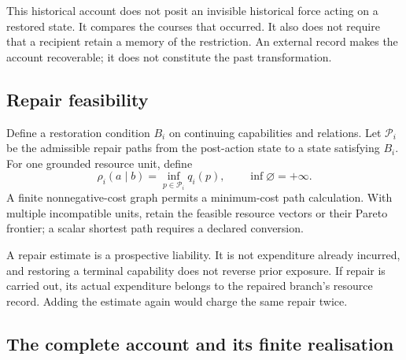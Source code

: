 \documentclass[11pt,a4paper]{article}
\theoremstyle{remark}
\begin{document}
This historical account does not posit an invisible historical force acting
on a restored state. It compares the courses that occurred. It also does not
require that a recipient retain a memory of the restriction. An external record
makes the account recoverable; it does not constitute the past transformation.

\subsection{Repair feasibility}

Define a restoration condition $B_i$ on continuing capabilities and relations.
Let $\mathcal P_i$ be the admissible repair paths from the post-action state to a
state satisfying $B_i$. For one grounded resource unit, define
\begin{equation}\label{eq:repair}
\rho_i(a\mid b)=\inf_{p\in\mathcal P_i}q_i(p),\qquad
\inf\varnothing=+\infty.
\end{equation}
A finite nonnegative-cost graph permits a minimum-cost path calculation. With
multiple incompatible units, retain the feasible resource vectors or their
Pareto frontier; a scalar shortest path requires a declared conversion.

A repair estimate is a prospective liability. It is not expenditure already
incurred, and restoring a terminal capability does not reverse prior exposure.
If repair is carried out, its actual expenditure belongs to the repaired
branch's resource record. Adding the estimate again would charge the same
repair twice.

\subsection{The complete account and its finite realisation}
\end{document}
